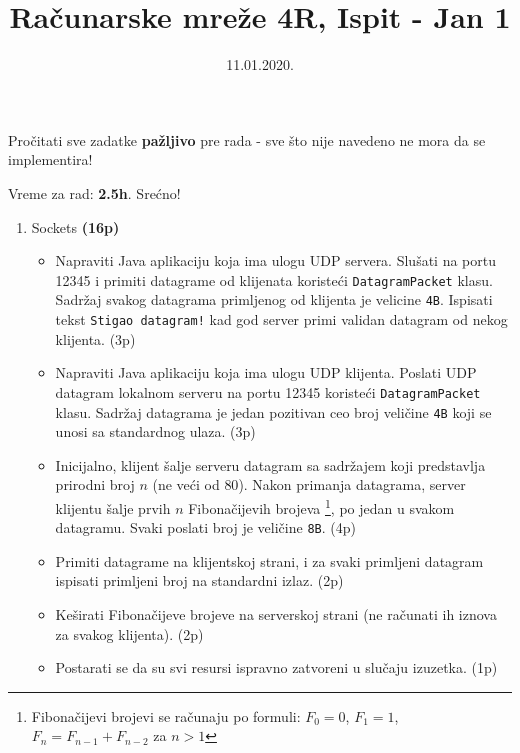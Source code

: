 \documentclass[]{article}
\title{Ra\v{c}unarske mre\v{z}e 4R, Ispit - Jan 1}
\date{11.01.2020.}
\begin{document}
\makeatletter
\begin{center}

{\fontsize{12pt}{14pt}\selectfont\bfseries\@title\par}
\@date

Pro\v{c}itati sve zadatke \textbf{pa\v{z}ljivo} pre rada - sve \v{s}to nije navedeno ne mora da se implementira! 

Vreme za rad: \textbf{2.5h}. Sre\'{c}no!
\end{center}
\makeatother


\begin{enumerate}
  \item Sockets \textbf{(16p)}
  \begin{itemize}
    \item Napraviti Java aplikaciju koja ima ulogu UDP servera. Slu\v{s}ati na portu 12345 i primiti datagrame od klijenata koriste\'c{}i \texttt{DatagramPacket} klasu. Sadr\v{z}aj svakog datagrama primljenog od klijenta je velicine \texttt{4B}. Ispisati tekst \texttt{Stigao datagram!} kad god server primi validan datagram od nekog klijenta. \hfill (3p)
    \item Napraviti Java aplikaciju koja ima ulogu UDP klijenta. Poslati UDP datagram lokalnom serveru na portu 12345 koriste\'c{}i \texttt{DatagramPacket} klasu. Sadr\v{z}aj datagrama je jedan pozitivan ceo broj veli\v{c}ine \texttt{4B} koji se unosi sa standardnog ulaza. \hfill (3p)
    \item Inicijalno, klijent \v{s}alje serveru datagram sa sadr\v{z}ajem koji predstavlja prirodni broj $n$ (ne ve\'c{}i od $80$). Nakon primanja datagrama, server klijentu \v{s}alje prvih $n$ Fibona\v{c}ijevih brojeva \footnote{Fibona\v{c}ijevi brojevi se ra\v{c}unaju po formuli: $F_0 = 0$, $F_1 = 1$, $F_n = F_{n-1} + F_{n-2}$ za $n > 1$}, po jedan u svakom datagramu. Svaki poslati broj je veli\v{c}ine \texttt{8B}. \hfill (4p)
    \item Primiti datagrame na klijentskoj strani, i za svaki primljeni datagram ispisati primljeni broj na standardni izlaz. \hfill (2p)
    \item Ke\v{s}irati Fibona\v{c}ijeve brojeve na serverskoj strani (ne ra\v{c}unati ih iznova za svakog klijenta). \hfill (2p)
    \item Postarati se da su svi resursi ispravno zatvoreni u slu\v{c}aju izuzetka. \hfill (1p)
  \end{itemize}


\end{enumerate}
\end{document}
